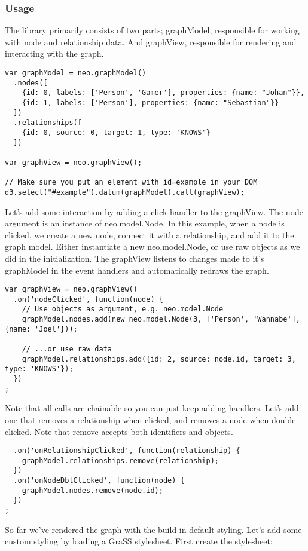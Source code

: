 \subsubsection{Usage}
\par The library primarily consists of two parts; graphModel, responsible for working with node and relationship data. And graphView, responsible for rendering and interacting with the graph.
\begin{lstlisting}
var graphModel = neo.graphModel()
  .nodes([
    {id: 0, labels: ['Person', 'Gamer'], properties: {name: "Johan"}},
    {id: 1, labels: ['Person'], properties: {name: "Sebastian"}}
  ])
  .relationships([
    {id: 0, source: 0, target: 1, type: 'KNOWS'}
  ])

var graphView = neo.graphView();

// Make sure you put an element with id=example in your DOM
d3.select("#example").datum(graphModel).call(graphView);
\end{lstlisting}
\par Let's add some interaction by adding a click handler to the graphView. The node argument is an instance of neo.model.Node. In this example, when a node is clicked, we create a new node, connect it with a relationship, and add it to the graph model. Either instantiate a new neo.model.Node, or use raw objects as we did in the initialization. The graphView listens to changes made to it's graphModel in the event handlers and automatically redraws the graph.
\begin{lstlisting}
var graphView = neo.graphView()
  .on('nodeClicked', function(node) {
    // Use objects as argument, e.g. neo.model.Node
    graphModel.nodes.add(new neo.model.Node(3, ['Person', 'Wannabe'], {name: 'Joel'}));

    // ...or use raw data
    graphModel.relationships.add({id: 2, source: node.id, target: 3, type: 'KNOWS'});
  })
;
\end{lstlisting}
\par 
Note that all calls are chainable so you can just keep adding handlers. Let's add one that removes a relationship when clicked, and removes a node when double-clicked. Note that remove accepts both identifiers and objects.
\begin{lstlisting}
  .on('onRelationshipClicked', function(relationship) {
    graphModel.relationships.remove(relationship);
  })
  .on('onNodeDblClicked', function(node) {
    graphModel.nodes.remove(node.id);
  })
;
\end{lstlisting}
\par So far we've rendered the graph with the build-in default styling. Let's add some custom styling by loading a GraSS stylesheet. First create the stylesheet:
